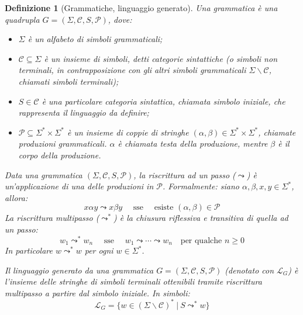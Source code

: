 \documentclass[12pt,a4paper,openright,twoside]{report}
\newtheorem{dfn}[thm]{Definizione}
\begin{document}
\begin{dfn}[Grammatiche, linguaggio generato]
Una grammatica \`e una quadrupla $G = (\Sigma, \mathcal{C}, S, \mathcal{P})$, dove:
\begin{itemize}
	\item $\Sigma$ \`e un alfabeto di \emph{simboli grammaticali};
	\item $\mathcal{C} \subseteq \Sigma$ \`e un insieme di simboli, detti \emph{categorie sintattiche} (o \emph{simboli non terminali}, in contrapposizione con gli altri simboli grammaticali $\Sigma{\smallsetminus}\mathcal{C}$, chiamati \emph{simboli terminali});
	\item $S \in \mathcal{C}$ \`e una particolare categoria sintattica, chiamata \emph{simbolo iniziale}, che rappresenta il linguaggio da definire;
	\item $\mathcal{P} \subseteq \Sigma^*{\times}\Sigma^*$ \`e un insieme di coppie di stringhe $(\alpha, \beta) \in \Sigma^*{\times}\Sigma^*$, chiamate \emph{produzioni grammaticali}. $\alpha$ \`e chiamata \emph{testa della produzione}, mentre $\beta$ \`e il \emph{corpo della produzione}.
\end{itemize}

Data una grammatica $(\Sigma, \mathcal{C}, S, \mathcal{P})$, la \emph{riscrittura ad un passo} ($\leadsto$) \`e un'applicazione di una delle produzioni in $\mathcal{P}$. Formalmente: siano $\alpha, \beta, x, y \in \Sigma^*$, allora:
$$
	x \alpha y \leadsto x \beta y \quad\mbox{ sse }\quad \mbox{esiste }(\alpha, \beta) \in \mathcal{P}
$$
La \emph{riscrittura multipasso} ($\leadsto^*$) \`e la chiusura riflessiva e transitiva di quella ad un passo:
$$
	w_1 \leadsto^* w_n \quad\mbox{ sse }\quad w_1 \leadsto \cdots \leadsto w_n \quad\mbox{per qualche $n \ge 0$}
$$
In particolare $w \leadsto^* w$ per ogni $w \in \Sigma^*$.

Il \emph{linguaggio generato da una grammatica} $G = (\Sigma, \mathcal{C}, S, \mathcal{P})$ (denotato con $\mathscr{L}_G$) \`e l'insieme delle stringhe di simboli terminali ottenibili tramite riscrittura multipasso a partire dal simbolo iniziale. In simboli:
$$
	\mathscr{L}_G = \{ w \in (\Sigma{\smallsetminus}\mathcal{C})^* \:|\: S \leadsto^* w\}
$$
\end{dfn}
\end{document}
